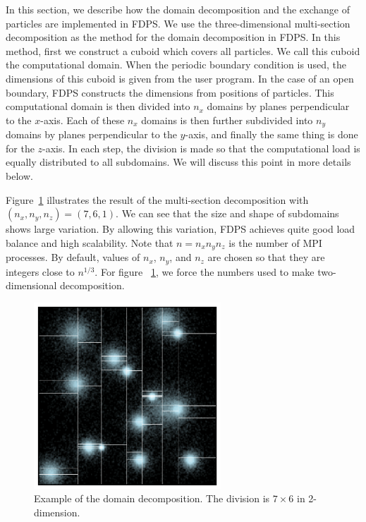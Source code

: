 In this section, we describe how the domain decomposition and the
exchange of particles are implemented in FDPS.  We use the
three-dimensional multi-section
decomposition \cite{2004PASJ...56..521M} as the method for the domain
decomposition in FDPS.  In this method, first we construct a cuboid
which covers all particles. We call this cuboid the computational
domain. When the periodic boundary condition is used, the dimensions
of this cuboid is given from the user program. In the case of an open
boundary, FDPS constructs the dimensions from positions of
particles. This computational domain is then divided into $n_x$
domains by planes perpendicular to the $x$-axis. Each of these $n_x$
domains is then further subdivided into $n_y$ domains by planes
perpendicular to the $y$-axis, and finally the same thing is done for
the $z$-axis.  In each step, the division is made so that the
computational load is equally distributed to all subdomains. We will
discuss this point in more details below.

Figure~\ref{fig:decomposition} illustrates the result of the
multi-section decomposition with $(n_x, n_y, n_z)=(7,6,1)$. We can see
that the size and shape of subdomains shows large variation. By
allowing this variation, FDPS achieves quite good load balance and
high scalability.  Note that $n=n_x n_y n_z$ is the number of MPI
processes. By default, values of $n_x$, $n_y$, and $n_z$ are chosen so
that they are integers close to $n^{1/3}$. For figure
~\ref{fig:decomposition}, we force the numbers used to make
two-dimensional decomposition.

\begin{figure}
  \begin{center}
    \includegraphics[width=7cm]{fig/pm3d.eps}
  \end{center}
  \caption{Example of the domain decomposition. The division is $7
    \times 6$ in 2-dimension.}
  \label{fig:decomposition}
\end{figure}

